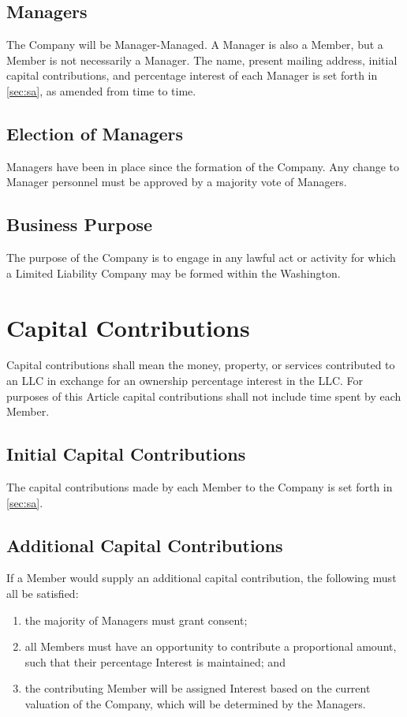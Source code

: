 \documentclass[11pt,onecolumn]{article}
\newcommand{\sa}{\autoref{sec:sa}}
\begin{document}
\subsection{Managers}

The Company will be Manager-Managed. A Manager is also a Member, but a Member is not necessarily a Manager. The name, present mailing address, initial capital contributions, and percentage interest of each Manager is set forth in \sa{}, as amended from time to time.

\subsection{Election of Managers}

Managers have been in place since the formation of the Company. Any change to Manager personnel must be approved by a majority vote of Managers.

\subsection{Business Purpose}

The purpose of the Company is to engage in any lawful act or activity for which a Limited Liability Company may be formed within the Washington.

\section{Capital Contributions}

Capital contributions shall mean the money, property, or services contributed to an LLC in exchange for an ownership percentage interest in the LLC. For purposes of this Article capital contributions shall not include time spent by each Member.

\subsection{Initial Capital Contributions}

The capital contributions made by each Member to the Company is set forth in \sa{}.

\subsection{Additional Capital Contributions}

If a Member would supply an additional capital contribution, the following must all be satisfied:
\vspace{-1\baselineskip}
\begin{enumerate}
	\item the majority of Managers must grant consent;
	\item all Members must have an opportunity to contribute a proportional amount, such that their percentage Interest is maintained; and
	\item the contributing Member will be assigned Interest based on the current valuation of the Company, which will be determined by the Managers. 
\end{enumerate}
\end{document}
